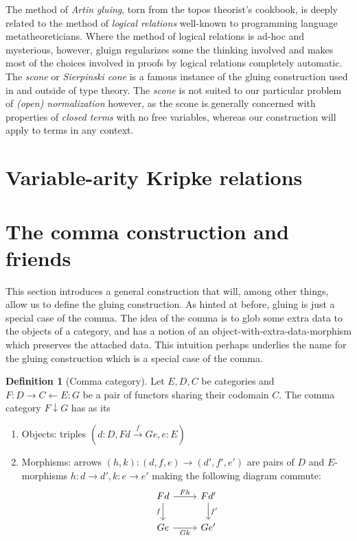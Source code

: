 \documentclass[12pt,twoside]{reedthesis}
\theoremstyle{definition}
\newtheorem{definition}{Definition}
\theoremstyle{remark}
\theoremstyle{plain}
\begin{document}
The method of \emph{Artin gluing}, torn from the topos theorist's cookbook, is
deeply related to the method of \emph{logical relations} well-known to
programming language metatheoreticians. Where the method of logical relations is
ad-hoc and mysterious, however, gluign regularizes some the thinking involved
and makes most of the choices involved in proofs by logical relations completely
automatic. The \emph{scone} or \emph{Sierpinski cone} is a famous instance of
the gluing construction used in and outside of type theory. The \emph{scone} is
not suited to our particular problem of \emph{(open) normalization} however, as
the scone is generally concerned with properties of \emph{closed terms} with no
free variables, whereas our construction will apply to terms in any context.

\section{Variable-arity Kripke relations}

\section{The comma construction and friends}
This section introduces a general construction that will, among other things,
allow us to define the gluing construction. As hinted at before, gluing is just
a special case of the comma. The idea of the comma is to glob some extra data to
the objects of a category, and has a notion of an
object-with-extra-data-morphism which preserves the attached data. This
intuition perhaps underlies the name for the gluing construction which is a
special case of the comma.

\begin{definition}[Comma category]
  Let $E,D,C$ be categories and $F: D \rightarrow C \leftarrow E : G$ be a pair of functors sharing
  their codomain $C$. The comma category \( F \downarrow G \) has as its
  \begin{enumerate}
    \item Objects: triples \( (d : D, Fd \xrightarrow{f} Ge, e : E) \)
    \item Morphisms: arrows $(h,k) : (d, f, e) \rightarrow (d', f', e')$ are pairs of
          $D$ and $E$-morphisms \(h : d \rightarrow d', k : e \rightarrow e'\) making the following
          diagram commute:
          \[
            \begin{tikzcd}
              Fd \arrow{r}{Fh} \arrow{d}[swap]{f} & Fd' \arrow{d}{f'} \\
              Ge \arrow{r}[swap]{Gk} & Ge'\\
            \end{tikzcd}
          \]
  \end{enumerate}
\end{definition}
\end{document}
